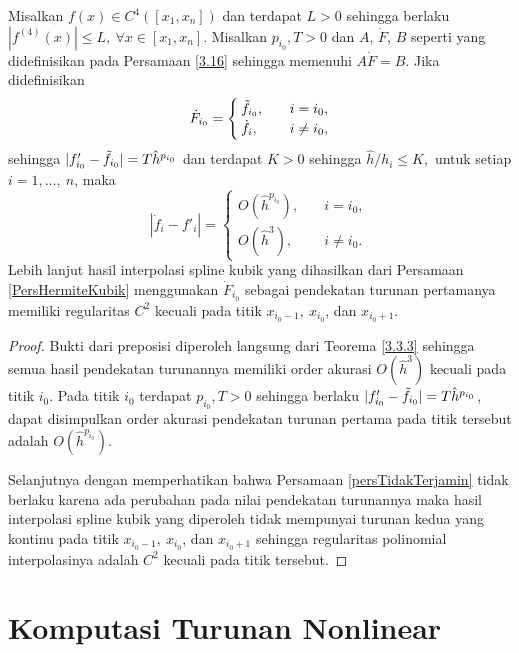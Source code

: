 \begin{proposisi}\label{proposisi4.3.1}
    Misalkan $f(x) \in C^4([x_1,x_n])$ dan terdapat $L>0$ sehingga berlaku $|f^{(4)}(x)|\leq L,~\forall x \in [x_1,x_n]$. Misalkan $p_{i_0}, T > 0$ dan $A$, $\dot{F}$, $B$ seperti yang didefinisikan pada Persamaan \eqref{3.16} sehingga memenuhi $A\dot{F} = B$. Jika didefinisikan
    \begin{equation*}
        \dot{F}_{i_0} = \begin{cases}
            \Tilde{f}_{i_0},\quad &i = i_0,\\
            \dot{f_i}, \quad &i \neq i_0,
        \end{cases}
    \end{equation*}
    sehingga $|f'_{i_0}-\Tilde{f}_{i_0}|=T\hat{h}^{p_{i_0}}$ dan terdapat $K>0$ sehingga $\hat{h}/h_i \leq K,$ untuk setiap $i=1,\dots,~n$, maka
    \begin{equation*}
        |\dot{f}_{i}-f'_i| = \begin{cases}
            O(\hat{h}^{p_{i_0}}),\quad &i = i_0,\\
            O(\hat{h}^{3}), \quad &i \neq i_0.
        \end{cases}
    \end{equation*}
    Lebih lanjut hasil interpolasi spline kubik yang dihasilkan dari Persamaan \eqref{PersHermiteKubik} menggunakan $\dot{F}_{i_0}$ sebagai pendekatan turunan pertamanya memiliki regularitas $C^2$ kecuali pada titik $x_{i_0-1},~x_{i_0}$, dan $x_{i_0+1}$.
\end{proposisi}
\begin{proof}
    Bukti dari preposisi diperoleh langsung dari Teorema \ref{3.3.3} sehingga semua hasil pendekatan turunannya memiliki order akurasi $O(\hat{h}^3)$ kecuali pada titik $i_0$. Pada titik $i_0$ terdapat $p_{i_0}, T > 0$ sehingga berlaku $|f'_{i_0}-\Tilde{f}_{i_0}|=T\hat{h}^{p_{i_0}}$, dapat disimpulkan order akurasi pendekatan turunan pertama pada titik tersebut adalah $O(\hat{h}^{p_{i_0}})$.

    Selanjutnya dengan memperhatikan bahwa Persamaan \eqref{persTidakTerjamin} tidak berlaku karena ada perubahan pada nilai pendekatan turunannya maka hasil interpolasi spline kubik yang diperoleh tidak mempunyai turunan kedua yang kontinu pada titik $x_{i_0-1},~x_{i_0}$, dan $x_{i_0+1}$ sehingga regularitas polinomial interpolasinya adalah $C^2$ kecuali pada titik tersebut.
\end{proof}

\section{Komputasi Turunan Nonlinear}\label{4.4}

